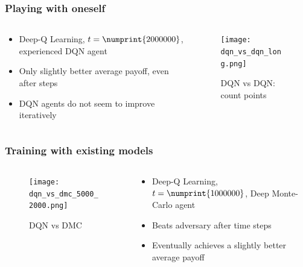 
\begin{frame}
\frametitle{Playing with oneself}
\begin{columns}[c]

\begin{column}{.5\textwidth}
\begin{itemize}
\item Deep-Q Learning, $t = \numprint{2000000}$, experienced DQN agent
\item Only slightly better average payoff, even after  steps
\item DQN agents do not seem to improve iteratively
\end{itemize}
\end{column}

\begin{column}{.5\textwidth}
\begin{figure}
\texttt{[image: dqn\_vs\_dqn\_long.png]}
\caption{DQN vs DQN: count points}
\end{figure}
\end{column}

\end{columns}
\end{frame}


\begin{frame}
\frametitle{Training with existing models}
\begin{columns}[c]

\begin{column}{.5\textwidth}
\begin{figure}
\texttt{[image: dqn\_vs\_dmc\_5000\_2000.png]}
\caption{DQN vs DMC}
\end{figure}
\end{column}

\begin{column}{.5\textwidth}
\begin{itemize}
\item Deep-Q Learning, $t = \numprint{1000000}$, Deep Monte-Carlo agent
\item Beats adversary after  time steps
\item Eventually achieves a slightly better average payoff
\end{itemize}
\end{column}

\end{columns}
\end{frame}